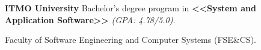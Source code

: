 
\vspace{0.8em}
\begin{scholarship}
     {\textbf {ITMO University} \newline
     Bachelor's degree program in \textbf {<<System and Application Software>>} \textit{(GPA: 4.78/5.0)}.

     Faculty of Software Engineering and Computer Systems (FSE\&CS).}
\end{scholarship}
